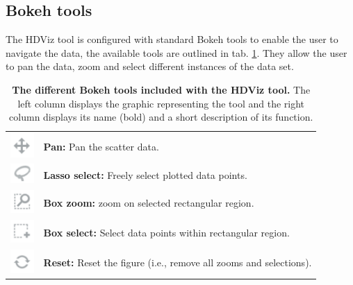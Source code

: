 \documentclass[11pt]{article} %
\begin{document}
\subsection{Bokeh tools}

The HDViz tool is configured with standard Bokeh tools to enable the user to navigate the data, the available tools are outlined in tab. \ref{tab:bokeh_tools}. They allow the user to pan the data, zoom and select different instances of the data set.

\begin{table}[!h]
\centering
\begin{tabular}{
    >{\centering\arraybackslash}m{1cm}%
    |>{\centering\arraybackslash}m{12cm}
    }

\includegraphics[width=0.35in]{images/bokeh_tools_move} & \textbf{Pan:} Pan the scatter data.  \\
\includegraphics[width=0.35in]{images/bokeh_tools_lassoo} & \textbf{Lasso select:} Freely select plotted data points.\\ 
\includegraphics[width=0.35in]{images/bokeh_tools_boxzoom} & \textbf{Box zoom:} zoom on selected rectangular region.   \\
\includegraphics[width=0.35in]{images/bokeh_tools_boxselect} & \textbf{Box select:} Select data points within rectangular region. \\ 
\includegraphics[width=0.35in]{images/bokeh_tools_reset} & \textbf{Reset:} Reset the figure (i.e., remove all zooms and selections).\\ 
\end{tabular}
\caption{\textbf{The different Bokeh tools included with the HDViz tool.} The left column displays the graphic representing the tool and the right column displays its name (bold) and a short description of its function.}
\label{tab:bokeh_tools}
\end{table}
\end{document}
